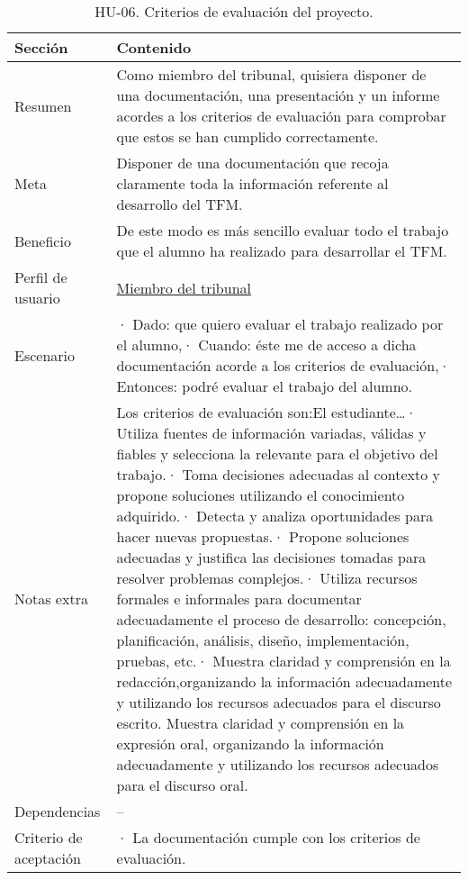 \begin{table}[H]
    \centering
    \def\arraystretch{1.25}
    \begin{adjustbox}{max width=\textwidth}
    \begin{tabularx}{\textwidth}{|l|L|}
    \hline
        \textbf{Sección} & \textbf{Contenido} \\ \hline
    \hline
        Resumen & Como miembro del tribunal, quisiera disponer de una documentación, una presentación y un informe acordes a los criterios de evaluación para comprobar que estos se han cumplido correctamente. \\ \hline
        Meta & Disponer de una documentación que recoja claramente toda la información referente al desarrollo del TFM. \\ \hline
        Beneficio & De este modo es más sencillo evaluar todo el trabajo que el alumno ha realizado para desarrollar el TFM. \\ \hline
        Perfil de usuario & \hyperref[sec:personaMiembroTribunal]{Miembro del tribunal} \\ \hline
        Escenario & · Dado: que quiero evaluar el trabajo realizado por el alumno,\linebreak · Cuando: éste me de acceso a dicha documentación acorde a los criterios de evaluación,\linebreak · Entonces: podré evaluar el trabajo del alumno. \\ \hline
        Notas extra & Los criterios de evaluación son:\linebreak El estudiante…\linebreak · Utiliza fuentes de información variadas, válidas y fiables y selecciona la relevante para el objetivo del trabajo.\linebreak · Toma decisiones adecuadas al contexto y propone soluciones utilizando el conocimiento adquirido.\linebreak · Detecta y analiza oportunidades para hacer nuevas propuestas.\linebreak · Propone soluciones adecuadas y justifica las decisiones tomadas para resolver problemas complejos.\linebreak · Utiliza recursos formales e informales para documentar adecuadamente el proceso de desarrollo: concepción, planificación, análisis, diseño, implementación, pruebas, etc.\linebreak · Muestra claridad y comprensión en la redacción,organizando la información adecuadamente y utilizando los recursos adecuados para el discurso escrito. Muestra claridad y comprensión en la expresión oral, organizando la información adecuadamente y utilizando los recursos adecuados para el discurso oral. \\ \hline
        Dependencias & – \\ \hline
        Criterio de aceptación & · La documentación cumple con los criterios de evaluación. \\ \hline
    \end{tabularx}
    \end{adjustbox}
    \caption{HU-06. Criterios de evaluación del proyecto.}
\end{table}


